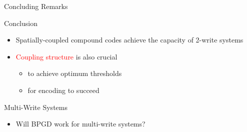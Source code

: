 \documentclass[10pt,presentation]{beamer}
\begin{document}
\begin{frame}{Concluding Remarks}
  \begin{block}{Conclusion}
    \begin{itemize}
    \item Spatially-coupled compound codes achieve the capacity of 2-write systems \vspace{0.2cm}
    \item \textcolor{red}{Coupling structure} is also crucial 
      \begin{itemize}
      \item to achieve optimum thresholds  
      \item for encoding to succeed 
      \end{itemize}
    \end{itemize}
  \end{block}
  \begin{block}{Multi-Write Systems}
    \begin{itemize}
    \item Will BPGD work for multi-write systems?
    \end{itemize}
  \end{block}
\end{frame}
\end{document}

